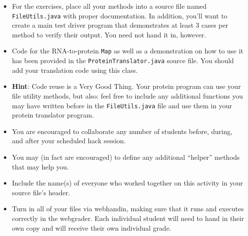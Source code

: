 \documentclass[12pt]{scrartcl}
\begin{document}
\begin{itemize}

  \item For the exercises, place all your methods into a source file 
  named \texttt{FileUtils.java} with proper documentation.
  In addition, you'll want
  to create a main test driver program that demonstrates at least 3 cases 
  per method to verify their output.  You need not hand it in, however.
  
  \item Code for the RNA-to-protein \texttt{Map} as well as 
  a demonstration on how to use it has been provided in the
  \texttt{ProteinTranslator.java} source file.  You should
  add your translation code using this class.

  \item \textbf{Hint}: Code reuse is a Very Good Thing.  Your protein program
  can use your file utility methods, but also: feel free to include
  any additional functions you may have written before in the 
  \texttt{FileUtils.java} file and use them in your protein translator program.

  \item You are encouraged to collaborate any number of students 
  before, during, and after your scheduled hack session.  

  \item You may (in fact are encouraged) to define any additional
  ``helper'' methods that may help you.

  \item Include the name(s) of everyone who worked together on
  this activity in your source file's header.

  \item Turn in all of your files via webhandin, making sure that 
  it runs and executes correctly in the webgrader.  Each individual 
  student will need to hand in their own copy and will receive 
  their own individual grade.
\end{itemize}  
\end{document}
